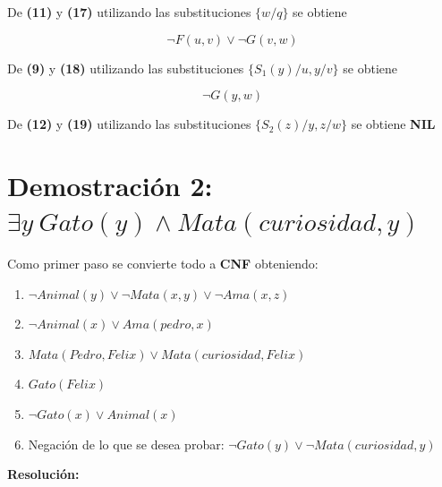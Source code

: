 \documentclass[12pt]{article} %
\begin{document}
\par De \textbf{(11)} y \textbf{(17)} utilizando las substituciones $\{w/q\}$ se obtiene

\begin{equation}
\neg F(u,v) \vee \neg G(v,w)
\end{equation}

\par De \textbf{(9)} y \textbf{(18)} utilizando las substituciones $\{S_1(y)/u, y/v\}$ se obtiene

\begin{equation}
\neg G(y,w)
\end{equation}

\par De \textbf{(12)} y \textbf{(19)} utilizando las substituciones $\{S_2(z)/y, z/w\}$ se obtiene \textbf{NIL}


\section{Demostración 2: $\exists y \  Gato(y) \wedge Mata(curiosidad,y)$}

\par Como primer paso se convierte todo a \textbf{CNF} obteniendo:

\begin{enumerate}
\item $\neg Animal(y)\vee\neg Mata(x,y)\vee\neg Ama(x,z)$
\item $\neg Animal(x)\vee Ama(pedro,x)$
\item $Mata(Pedro,Felix)\vee Mata(curiosidad,Felix)$
\item $Gato(Felix)$
\item $\neg Gato(x)\vee Animal(x)$
\item Negación de lo que se desea probar: $\neg Gato(y)\vee\neg Mata(curiosidad,y)$
\end{enumerate}

\par \textbf{Resolución:} 
\end{document}
